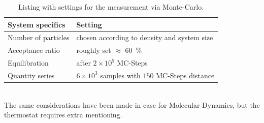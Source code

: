 \begin{table}[ht]
	\centering
	\begin{tabular}{l | l}
		System specifics &Setting \\
		\hline
		Number of particles &chosen according to density and system size\\
		Acceptance ratio&roughly set $\approx$ \SI{60}{\percent}\\
		Equilibration&after $2\times10^5$ MC-Steps\\
		Quantity series&$6\times10^3$ samples with $150$ MC-Steps distance\\
	\end{tabular}
	\caption[MC: Settings]{Listing with settings for the measurement via Monte-Carlo.}
	\label{tbl:MCSettings}
\end{table}\\
The same considerations have been made in case for Molecular Dynamics, but the thermostat requires extra mentioning.
